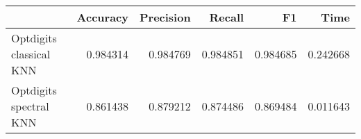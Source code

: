 \begin{tabular}{lrrrrr}
\toprule
{} &  Accuracy &  Precision &    Recall &        F1 &      Time \\
\midrule
Optdigits classical KNN &  0.984314 &   0.984769 &  0.984851 &  0.984685 &  0.242668 \\
Optdigits spectral KNN  &  0.861438 &   0.879212 &  0.874486 &  0.869484 &  0.011643 \\
\bottomrule
\end{tabular}
